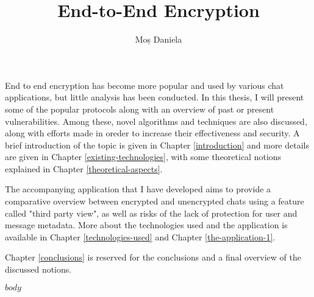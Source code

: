 \documentclass[12pt]{report}
\begin{document}
\title{End-to-End Encryption}
\author{Moș Daniela}			


\maketitle



\cleardoublepage
\abstract

End to end encryption has become more popular and used by various chat applications, but little analysis has been conducted. In this thesis, I will present some of the popular protocols along with an overview of past or present vulnerabilities. Among these, novel algorithms and techniques are also discussed, along with efforts made in oreder to increase their effectiveness and security. A brief introduction of the topic is given in Chapter \ref{introduction} and more details are given in Chapter \ref{existing-technologies}, with some theoretical notions explained in Chapter \ref{theoretical-aspects}. 

The accompanying application that I have developed aims to provide a comparative overview between encrypted and unencrypted chats using a feature called "third party view", as well as risks of the lack of protection for user and message metadata. More about the technologies used and the application is available in Chapter \ref{technologies-used} and Chapter \ref{the-application-1}. 

Chapter \ref{conclusions} is reserved for the conclusions and a final overview of the discussed notions. 

\tableofcontents
\listoffigures


\newpage
{}

$body$
\end{document}
